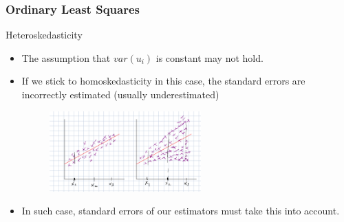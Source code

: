 \documentclass[compress]{beamer}
\begin{document}
\begin{frame}
\frametitle{Ordinary Least Squares}
Heteroskedasticity
\begin{itemize}
\item The assumption that $var(u_i)$ is constant may not hold.
\item If we stick to homoskedasticity in this case, the standard errors are incorrectly estimated (usually underestimated)
\begin{figure}[H]
\centering
\includegraphics[width=0.55\textwidth]{hetero.png}
\end{figure}
\item  In such case, standard errors of our estimators must take this into account.
\end{itemize}
\end{frame}
\end{document}
